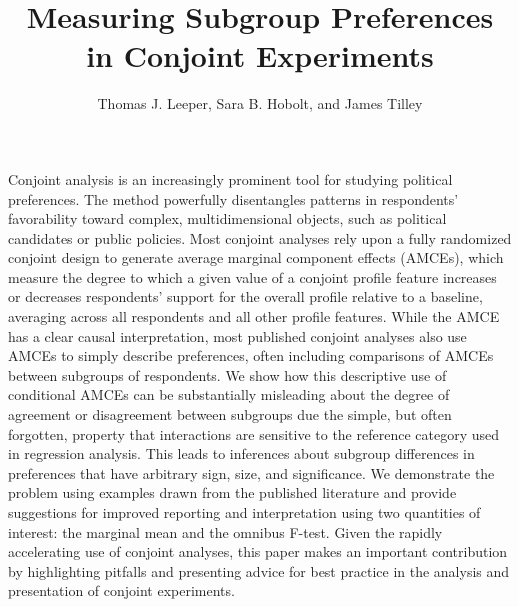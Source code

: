 \documentclass[a4paper,12pt]{article}\usepackage[]{graphicx}\usepackage[]{color}
\title{Measuring Subgroup Preferences in Conjoint Experiments}
\author{Thomas J. Leeper, Sara B. Hobolt, and James Tilley}
\begin{document}
\maketitle

{\abstract Conjoint analysis is an increasingly prominent tool for studying political preferences. The method powerfully disentangles patterns in respondents' favorability toward complex, multidimensional objects, such as political candidates or public policies. Most conjoint analyses rely upon a fully randomized conjoint design to generate average marginal component effects (AMCEs), which measure the degree to which a given value of a conjoint profile feature increases or decreases respondents' support for the overall profile relative to a baseline, averaging across all respondents and all other profile features. While the AMCE has a clear causal interpretation, most published conjoint analyses also use AMCEs to simply describe preferences, often including comparisons of AMCEs between subgroups of respondents. We show how this descriptive use of conditional AMCEs can be substantially misleading about the degree of agreement or disagreement between subgroups due the simple, but often forgotten, property that interactions are sensitive to the reference category used in regression analysis. This leads to inferences about subgroup differences in preferences that have arbitrary sign, size, and significance. We demonstrate the problem using examples drawn from the published literature and provide suggestions for improved reporting and interpretation using two quantities of interest: the marginal mean and the omnibus F-test. Given the rapidly accelerating use of conjoint analyses, this paper makes an important contribution by highlighting pitfalls and presenting advice for best practice in the analysis and presentation of conjoint experiments.}

















\clearpage
\end{document}
